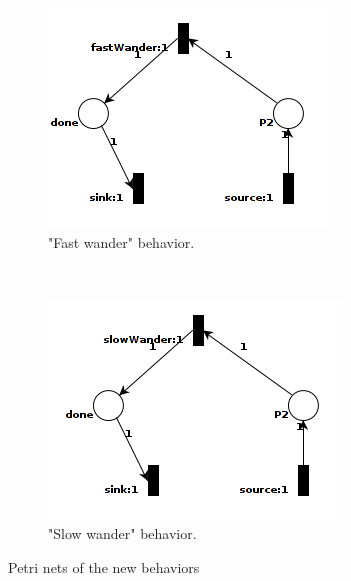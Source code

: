 \documentclass[11pt, a4paper]{book}
\begin{document}
\begin{figure}
        \centering
        \begin{subfigure}[b]{0.5\textwidth}
                \includegraphics[width=\textwidth]{fastWanderSituation}
                \caption{"Fast wander" behavior.}
                \label{fig:fastWanderPetrinet}
        \end{subfigure}%
        ~ %
        \begin{subfigure}[b]{0.5\textwidth}
                \includegraphics[width=\textwidth]{slowWanderSituation}
                \caption{"Slow wander" behavior.}
                \label{fig:slowWanderPetrinet}
        \end{subfigure}
        \caption{Petri nets of the new behaviors}\label{fig:newSituations}
\end{figure}
\end{document}
